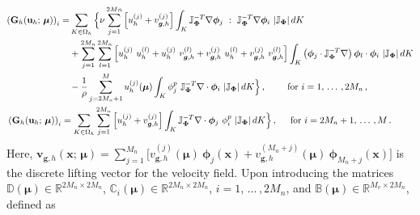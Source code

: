 \documentclass[12pt, a4paper, twoside, openright]{report}
\numberwithin{equation}{chapter}
\theoremstyle{theorem}
\theoremstyle{definition}
\theoremstyle{remark}
\theoremstyle{proposition}
\numberwithin{figure}{chapter}
\newcommand{\bg}[1]{\boldsymbol{#1}}
\begin{document}
		\begin{equation*}
			\begin{aligned}
				&
				\begin{aligned}
					\left( \mathbf{G}_h(\mathbf{u}_h; \, \bg{\mu}) \right)_i = & \sum_{K \in \Omega_h} \Big\lbrace \nu \sum_{j = 1}^{2 Mn} \left[ u_h^{(j)} + v_{\bg{g},h}^{(j)} \right] \int_K \mathbb{J}_{\bg{\Phi}}^{-T} \nabla \bg{\phi}_j ~ : ~ \mathbb{J}_{\bg{\Phi}}^{-T} \nabla \bg{\phi}_i ~ |\mathbb{J}_{\bg{\Phi}}| \, dK \\
					& + \sum_{j = 1}^{2 M_n} \sum_{l = 1}^{2 M_n} \left[ u_h^{(j)} ~ u_h^{(l)} + u_h^{(j)} ~ v_{\bg{g},h}^{(l)} + v_{\bg{g},h}^{(j)} ~ u_h^{(l)} + v_{\bg{g},h}^{(j)} ~ v_{\bg{g},h}^{(l)} \right] \int_K \left( \bg{\phi}_j \cdot \mathbb{J}_{\bg{\Phi}}^{-T} \nabla \right) \bg{\phi}_l \cdot \bg{\phi}_i ~ |\mathbb{J}_{\bg{\Phi}}| \, dK \\
					& - \dfrac{1}{\rho} \sum_{j = 2 M_n + 1}^{M} u_h^{(j)}(\bg{\mu}) \int_K \phi^p_j ~ \mathbb{J}_{\bg{\Phi}}^{-T} \nabla \cdot \bg{\phi}_i ~ |\mathbb{J}_{\bg{\Phi}}| \, dK \Big\rbrace \, , \hspace*{0.82cm} \text{for $i = 1, \, \ldots \, , 2 M_n$} \, , 
				\end{aligned} \\
				& \left( \mathbf{G}_h(\mathbf{u}_h; \, \bg{\mu}) \right)_i = \sum_{K \in \Omega_h} \sum_{j = 1}^{2 M_n} \left[ u_h^{(j)} + v_{\bg{g},h}^{(j)} \right] \int_K \mathbb{J}_{\bg{\Phi}}^{-T} \nabla \cdot \bg{\phi}_j ~ \phi_i^p ~ |\mathbb{J}_{\bg{\Phi}}| \, dK \Big\rbrace \, , \hspace*{0.5cm} \text{for $i = 2 M_n + 1, \, \ldots \, , M$} \, .
			\end{aligned}
		\end{equation*}
		Here, $\bg{v}_{\bg{g},h}(\bg{x}; \, \bg{\mu}) = \sum_{j = 1}^{M_n} \big[ v_{\bg{g},h}^{(j)}(\bg{\mu}) ~ \bg{\phi}_j(\bg{x}) + v_{\bg{g},h}^{(M_n + j)}(\bg{\mu}) ~ \bg{\phi}_{M_n + j}(\bg{x}) \big]$ is the discrete lifting vector for the velocity field. Upon introducing the matrices $\mathbb{D}(\bg{\mu}) \in \mathbb{R}^{2 M_n \times 2 M_n}$, $\mathbb{C}_i(\bg{\mu}) \in \mathbb{R}^{2 M_n \times 2 M_n}$, $i = 1, \, \ldots \, , 2 M_n$, and $\mathbb{B}(\bg{\mu}) \in \mathbb{R}^{M_v \times 2 M_n}$, defined as
\end{document}
